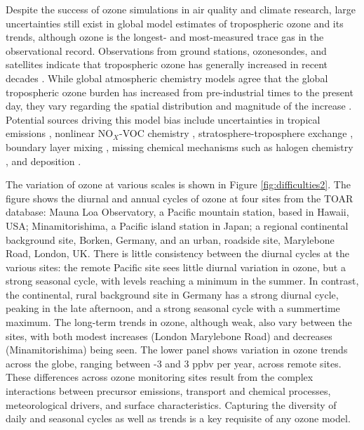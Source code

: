 \documentclass[gmd, manuscript]{copernicus}
\begin{document}
Despite the success of ozone simulations in air quality and climate research, large uncertainties still exist in global model estimates of tropospheric ozone and its trends, although ozone is the longest- and most-measured trace gas in the observational record. Observations from ground stations, ozonesondes, and satellites indicate that tropospheric ozone has generally increased in recent decades \citep{ziemke_trends_2019, young_tropospheric_2018, IPCC_2021_WGI_Ch_2}. While global atmospheric chemistry models agree that the global tropospheric ozone burden has increased from pre-industrial times to the present day, they vary regarding the spatial distribution and magnitude of the increase \citep{skeie_historical_2020, christiansen_multidecadal_2022, fiore_understanding_2022}. Potential sources driving this model bias include uncertainties in tropical emissions \citep{zhang_contributions_2021}, nonlinear NO$_X$-VOC chemistry \citep{shah_nitrogen_2023}, stratosphere-troposphere exchange \citep{neu_tropospheric_2014}, boundary layer mixing \citep{lu_exploring_2019}, missing chemical mechanisms such as halogen chemistry \citep{wang_active_2015}, and deposition \citep{clifton_dry_2020}. 


The variation of ozone at various scales is shown in Figure \ref{fig:difficulties2}.  The figure shows the diurnal and annual cycles of ozone at four sites from the TOAR database: Mauna Loa Observatory, a Pacific mountain station, based in Hawaii, USA;  Minamitorishima, a Pacific island station in Japan; a regional continental background site, Borken, Germany, and an urban, roadside site, Marylebone Road, London, UK.  There is little consistency between the diurnal cycles at the various sites: the remote Pacific site sees little diurnal variation in ozone, but a strong seasonal cycle, with levels reaching a minimum in the summer.  In contrast, the continental, rural background site in Germany has a strong diurnal cycle, peaking in the late afternoon, and a strong seasonal cycle with a summertime maximum. The long-term trends in ozone, although weak, also vary between the sites, with both modest increases (London Marylebone Road) and decreases (Minamitorishima) being seen. The lower panel shows variation in ozone trends across the globe, ranging between -3 and 3 ppbv per year, across remote sites. These differences across ozone monitoring sites result from the complex interactions between precursor emissions, transport and chemical processes, meteorological drivers, and surface characteristics. Capturing the diversity of daily and seasonal cycles as well as trends is a key requisite of any ozone model.
\end{document}
